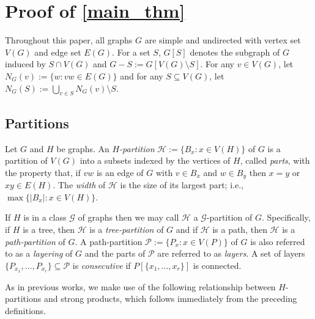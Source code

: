 \documentclass{patmorin}
\newcommand{\defin}[1]{\emph{\color{brightmaroon}#1}}
\begin{document}

\section{Proof of \cref{main_thm}}



Throughout this paper, all graphs $G$ are simple and undirected with vertex set $V(G)$ and edge set $E(G)$.  For a set $S$, $G[S]$ denotes the subgraph of $G$ induced by $S\cap V(G)$ and $G-S:=G[V(G)\setminus S]$.  For any $v\in V(G)$, let $N_G(v):=\{w:vw\in E(G)\}$ and for any $S\subseteq V(G)$, let $N_G(S):=\bigcup_{v\in S} N_G(v)\setminus S$.

\subsection{Partitions}

Let $G$ and $H$ be graphs.  An \defin{$H$-partition} $\mathcal{H}:=\{B_x:x\in V(H)\}$ of $G$ is a partition  of $V(G)$ into a subsets indexed by the vertices of $H$, called \defin{parts}, with the property that, if $vw$ is an edge of $G$ with $v\in B_x$ and $w\in B_y$ then $x=y$ or $xy\in E(H)$.  The \defin{width} of $\mathcal{H}$ is the size of its largest part; i.e., $\max\{|B_x|:x\in V(H)\}$.

If $H$ is in a class $\mathcal{G}$ of graphs then we may call $\mathcal{H}$ a $\mathcal{G}$-partition of $G$.  Specifically, if $H$ is a tree, then $\mathcal{H}$ is a \defin{tree-partition} of $G$ and if $\mathcal{H}$ is a path, then $\mathcal{H}$ is a \defin{path-partition} of $G$.  A path-partition $\mathcal{P}:=\{P_x:x\in V(P)\}$ of $G$ is also referred to as a \defin{layering} of $G$ and the parts of $\mathcal{P}$ are referred to as \defin{layers}.  A set of layers $\{P_{x_1},\ldots,P_{x_r}\}\subseteq\mathcal{P}$ is \defin{consecutive} if $P[\{x_1,\ldots,x_r\}]$ is connected.

As in previous works, we make use of the following relationship between $H$-partitions and strong products, which follows immediately from the preceding definitions.
\end{document}
